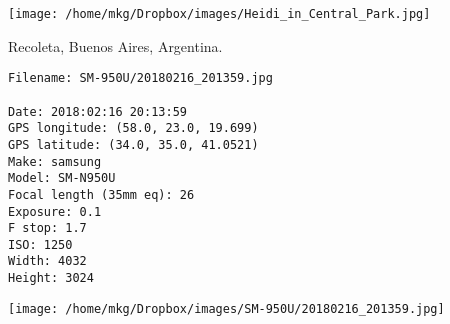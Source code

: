 \clearpage

\texttt{[image: /home/mkg/Dropbox/images/Heidi\_in\_Central\_Park.jpg]}
\clearpage


\noindent Recoleta, Buenos Aires, Argentina.
\begin{lstlisting}
Filename: SM-950U/20180216_201359.jpg

Date: 2018:02:16 20:13:59
GPS longitude: (58.0, 23.0, 19.699)
GPS latitude: (34.0, 35.0, 41.0521)
Make: samsung
Model: SM-N950U
Focal length (35mm eq): 26
Exposure: 0.1
F stop: 1.7
ISO: 1250
Width: 4032
Height: 3024
\end{lstlisting}

\begin{landscape}

\texttt{[image: /home/mkg/Dropbox/images/SM-950U/20180216\_201359.jpg]}
\end{landscape}

